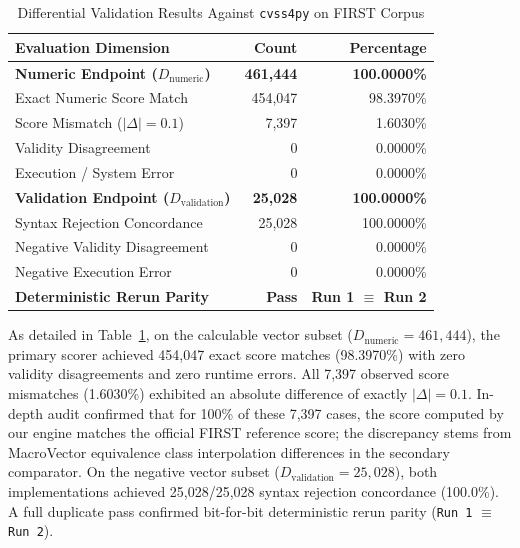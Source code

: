 \documentclass[conference]{IEEEtran}
\begin{document}
\begin{table}[t]
\caption{Differential Validation Results Against \texttt{cvss4py} on FIRST Corpus}
\label{tab:diff_r2}
\centering
\small
\begin{tabular}{@{}lrr@{}}
\toprule
Evaluation Dimension & Count & Percentage \\
\midrule
\textbf{Numeric Endpoint ($D_{\text{numeric}}$)} & \textbf{461,444} & \textbf{100.0000\%} \\
\quad Exact Numeric Score Match                  & 454,047 & 98.3970\% \\
\quad Score Mismatch ($|\Delta| = 0.1$)           & 7,397   & 1.6030\% \\
\quad Validity Disagreement                      & 0       & 0.0000\% \\
\quad Execution / System Error                   & 0       & 0.0000\% \\
\midrule
\textbf{Validation Endpoint ($D_{\text{validation}}$)} & \textbf{25,028} & \textbf{100.0000\%} \\
\quad Syntax Rejection Concordance               & 25,028  & 100.0000\% \\
\quad Negative Validity Disagreement             & 0       & 0.0000\% \\
\quad Negative Execution Error                   & 0       & 0.0000\% \\
\midrule
\textbf{Deterministic Rerun Parity}              & \textbf{Pass} & \textbf{Run 1 $\equiv$ Run 2} \\
\bottomrule
\end{tabular}
\end{table}

As detailed in Table~\ref{tab:diff_r2}, on the calculable vector subset ($D_{\text{numeric}} = 461,444$), the primary scorer achieved 454,047 exact score matches (98.3970\%) with zero validity disagreements and zero runtime errors. All 7,397 observed score mismatches (1.6030\%) exhibited an absolute difference of exactly $|\Delta| = 0.1$. In-depth audit confirmed that for 100\% of these 7,397 cases, the score computed by our engine matches the official FIRST reference score; the discrepancy stems from MacroVector equivalence class interpolation differences in the secondary comparator. On the negative vector subset ($D_{\text{validation}} = 25,028$), both implementations achieved 25,028/25,028 syntax rejection concordance (100.0\%). A full duplicate pass confirmed bit-for-bit deterministic rerun parity (\texttt{Run 1} $\equiv$ \texttt{Run 2}).
\end{document}
